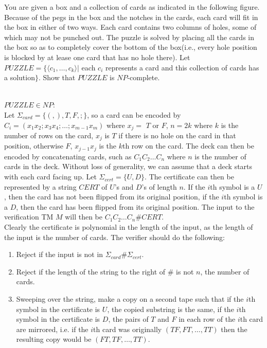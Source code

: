 \documentclass{assignment}
\begin{document}
\begin{problemlist}
\pbitem
\begin{problem}
You are given a box and a collection of cards as indicated in the following figure. Because of the pegs in the box and the notches in the cards, each card will fit in the box in either of two ways. Each card contains two columns of holes, some of which may not be punched out. The puzzle is solved by placing all the cards in the box so as to completely cover the bottom of the box(i.e., every hole position is blocked by at lease one card that has no hole there). Let $PUZZLE=\{ \langle c_1,\ldots,c_k\rangle |$ each $c_i$ represents a card and this collection of cards has a solution$\}$. Show that $PUZZLE$ is $NP$-complete.
\end{problem}
\begin{answer}
\\
$PUZZLE \in NP$:\\
Let $\Sigma_{card} = \{(, ), T, F, ;\}$, so a card can be encoded by $C_i=(x_1x_2;x_3x_4;\ldots;x_{m-1}x_m)$ where $x_j=$ $T$ or $F$, $n=2k$ where $k$ is the number of rows on the card, $x_j$ is $T$ if there is no hole on the card in that position, otherwise $F$, $x_{j-1}x_j$ is the $k$th row on the card. The deck can then be encoded by concatenating cards, such as $C_1C_2\ldots C_n$ where $n$ is the number of cards in the deck. Without loss of generality, we can assume that a deck starts with each card facing up. Let $\Sigma_{cert}=\{U, D\}$. The certificate can then be represented by a string $CERT$ of $U$'s and $D$'s of length $n$. If the $i$th symbol is a $U$, then the card has not been flipped from its original position, if the $i$th symbol is a $D$, then the card has been flipped from its original position. The input to the verification TM $M$ will then be $C_1C_2\ldots C_n\#CERT$. \\
Clearly the certificate is polynomial in the length of the input, as the length of the input is the number of cards. 
The verifier should do the following:
\begin{enumerate}
\item Reject if the input is not in $\Sigma_{card}\# \Sigma_{cert}$.
\item Reject if the length of the string to the right of $\#$ is not $n$, the number of cards.
\item Sweeping over the string, make a copy on a second tape such that if the $i$th symbol in the certificate is $U$, the copied substring is the same, if the $i$th symbol in the certificate is $D$, the pairs of $T$ and $F$ in each row of the $i$th card are mirrored, i.e. if the $i$th card was originally $(TF,FT,\dots,TT)$ then the resulting copy would be $(FT,TF,\ldots,TT)$.

\end{enumerate}
\end{answer}
\end{problemlist}
\end{document}
